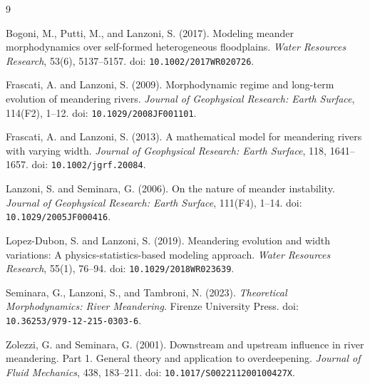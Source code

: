 \documentclass[11pt,a4paper]{article}
\begin{document}
\begin{thebibliography}{9}

Bogoni, M., Putti, M., and Lanzoni, S. (2017). Modeling meander morphodynamics over self-formed heterogeneous floodplains. \emph{Water Resources Research}, 53(6), 5137--5157. doi: \texttt{10.1002/2017WR020726}.

Frascati, A. and Lanzoni, S. (2009). Morphodynamic regime and long-term evolution of meandering rivers. \emph{Journal of Geophysical Research: Earth Surface}, 114(F2), 1--12. doi: \texttt{10.1029/2008JF001101}.

Frascati, A. and Lanzoni, S. (2013). A mathematical model for meandering rivers with varying width. \emph{Journal of Geophysical Research: Earth Surface}, 118, 1641--1657. doi: \texttt{10.1002/jgrf.20084}.

Lanzoni, S. and Seminara, G. (2006). On the nature of meander instability. \emph{Journal of Geophysical Research: Earth Surface}, 111(F4), 1--14. doi: \texttt{10.1029/2005JF000416}.

Lopez-Dubon, S. and Lanzoni, S. (2019). Meandering evolution and width variations: A physics-statistics-based modeling approach. \emph{Water Resources Research}, 55(1), 76--94. doi: \texttt{10.1029/2018WR023639}.

Seminara, G., Lanzoni, S., and Tambroni, N. (2023). \emph{Theoretical Morphodynamics: River Meandering}. Firenze University Press. doi: \texttt{10.36253/979-12-215-0303-6}.

Zolezzi, G. and Seminara, G. (2001). Downstream and upstream influence in river meandering. Part 1. General theory and application to overdeepening. \emph{Journal of Fluid Mechanics}, 438, 183--211. doi: \texttt{10.1017/S002211200100427X}.

\end{thebibliography}
\end{document}
